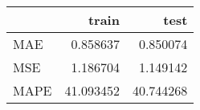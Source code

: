 \begin{tabular}{lrr}
\toprule
{} &      train &       test \\
\midrule
MAE  &   0.858637 &   0.850074 \\
MSE  &   1.186704 &   1.149142 \\
MAPE &  41.093452 &  40.744268 \\
\bottomrule
\end{tabular}
